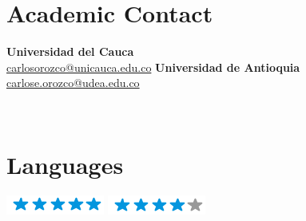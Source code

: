 \documentclass[american]{cv-class}
\begin{document}
\begin{aside}
	\section{Academic Contact}
	{} \textbf{Universidad del Cauca} \\
	\href{mailto:carlosorozco@unicauca.edu.co}{carlosorozco@unicauca.edu.co}
	{}\textbf{Universidad de Antioquia} \\
	\href{mailto:carlose.orozco@udea.edu.co}{carlose.orozco@udea.edu.co}
	
	~
	\section{Languages}
	{\includegraphics[scale=0.40]{img/5stars.png}}
	{\includegraphics[scale=0.40]{img/4stars.png}}
	~
	

\end{aside}
\end{document}
